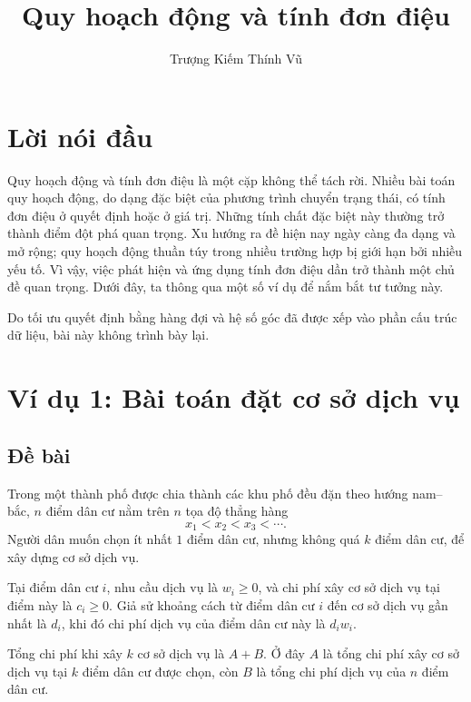 \documentclass[11pt]{article}
\title{Quy hoạch động và tính đơn điệu}
\author{Trượng Kiếm Thính Vũ}
\date{}
\begin{document}
\maketitle


\section*{Lời nói đầu}

Quy hoạch động và tính đơn điệu là một cặp không thể tách rời. Nhiều bài toán
quy hoạch động, do dạng đặc biệt của phương trình chuyển trạng thái, có tính
đơn điệu ở quyết định hoặc ở giá trị. Những tính chất đặc biệt này thường trở
thành điểm đột phá quan trọng. Xu hướng ra đề hiện nay ngày càng đa dạng và
mở rộng; quy hoạch động thuần túy trong nhiều trường hợp bị giới hạn bởi
nhiều yếu tố. Vì vậy, việc phát hiện và ứng dụng tính đơn điệu dần trở thành
một chủ đề quan trọng. Dưới đây, ta thông qua một số ví dụ để nắm bắt tư
tưởng này.

Do tối ưu quyết định bằng hàng đợi và hệ số góc đã được xếp vào phần cấu trúc
dữ liệu, bài này không trình bày lại.

\section{Ví dụ 1: Bài toán đặt cơ sở dịch vụ}

\subsection*{Đề bài}

Trong một thành phố được chia thành các khu phố đều đặn theo hướng nam--bắc,
$n$ điểm dân cư nằm trên $n$ tọa độ thẳng hàng
\[
  x_1 < x_2 < x_3 < \cdots .
\]
Người dân muốn chọn ít nhất $1$ điểm dân cư, nhưng không quá $k$ điểm dân cư,
để xây dựng cơ sở dịch vụ.

Tại điểm dân cư $i$, nhu cầu dịch vụ là $w_i\ge 0$, và chi phí xây cơ sở dịch
vụ tại điểm này là $c_i\ge 0$. Giả sử khoảng cách từ điểm dân cư $i$ đến cơ
sở dịch vụ gần nhất là $d_i$, khi đó chi phí dịch vụ của điểm dân cư này là
$d_i w_i$.

Tổng chi phí khi xây $k$ cơ sở dịch vụ là $A+B$. Ở đây $A$ là tổng chi phí xây
cơ sở dịch vụ tại $k$ điểm dân cư được chọn, còn $B$ là tổng chi phí dịch vụ
của $n$ điểm dân cư.
\end{document}
